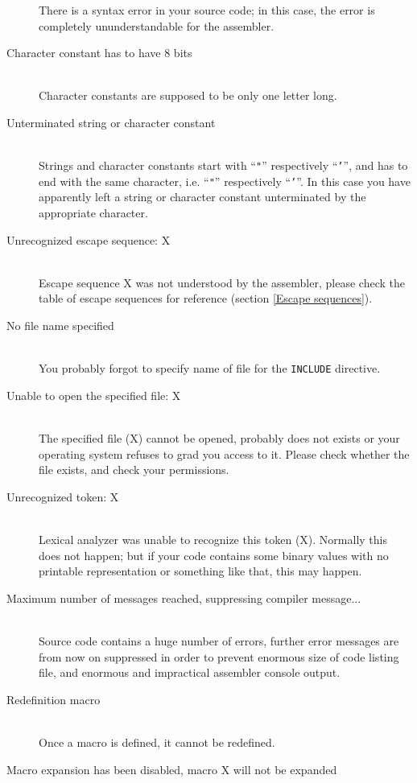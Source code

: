 \begin{description}
            There is a syntax error in your source code; in this case, the error is completely ununderstandable for the assembler.
        \item[Character constant has to have 8 bits]~\\
            Character constants are supposed to be only one letter long.
        \item[Unterminated string or character constant]~\\
            Strings and character constants start with ``\texttt{"}'' respectively ``\texttt{'}'', and has to end with the same character, i.e. ``\texttt{"}'' respectively ``\texttt{'}''. In this case you have apparently left a string or character constant unterminated by the appropriate character.
        \item[Unrecognized escape sequence: X]~\\
            Escape sequence X was not understood by the assembler, please check the table of escape sequences for reference (section \ref{Escape sequences}).
        \item[No file name specified]~\\
            You probably forgot to specify name of file for the \texttt{INCLUDE} directive.
        \item[Unable to open the specified file: X]~\\
            The specified file (X) cannot be opened, probably does not exists or your operating system refuses to grad you access to it. Please check whether the file exists, and check your permissions.
        \item[Unrecognized token: X]~\\
            Lexical analyzer was unable to recognize this token (X). Normally this does not happen; but if your code contains some binary values with no printable representation or something like that, this may happen.
        \item[Maximum number of messages reached, suppressing compiler message...]~\\
            Source code contains a huge number of errors, further error messages are from now on suppressed in order to prevent enormous size of code listing file, and enormous and impractical assembler console output.
        \item[Redefinition macro]~\\
            Once a macro is defined, it cannot be redefined.
        \item[Macro expansion has been disabled, macro X will not be expanded]~\\

\end{description}
